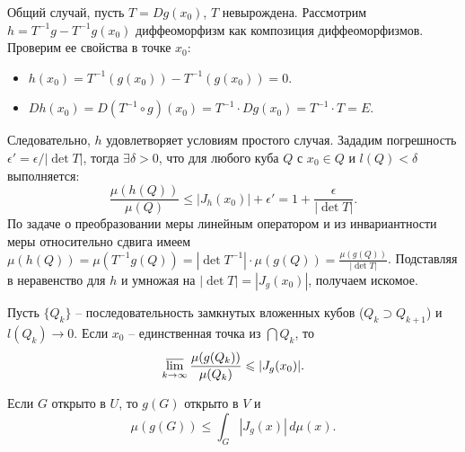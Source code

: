 \begin{myproof}
    \vspace{5pt}
    Общий случай, пусть $T = Dg(x_0)$, $T$ невырождена. Рассмотрим $h = T^{-1} g - T^{-1} g(x_0)$ диффеоморфизм как композиция диффеоморфизмов.
	Проверим ее свойства в точке $x_0$:
	\begin{itemize}[itemsep = 0pt, topsep = 5pt]
		\item $h(x_0) = T^{-1}(g(x_0)) - T^{-1}(g(x_0)) = 0$.
		\item $Dh(x_0) = D(T^{-1} \circ g)(x_0) = T^{-1} \cdot Dg(x_0) = T^{-1} \cdot T = E$.
	\end{itemize}
    Следовательно, $h$ удовлетворяет условиям простого случая. Зададим погрешность $\epsilon' = \epsilon / |\det T|$, тогда $\exists \delta > 0$, что для любого куба $Q$ с $x_0 \in Q$ и $l(Q) < \delta$ 
	выполняется: 
    \[ \frac{\mu(h(Q))}{\mu(Q)} \leq |J_h(x_0)| + \epsilon' = 1 + \frac{\epsilon}{|\det T|}. \]
    По задаче о преобразовании меры линейным оператором и из инвариантности меры относительно сдвига имеем $\mu(h(Q)) = \mu(T^{-1} g(Q)) = |\det T^{-1}| \cdot \mu(g(Q)) = \frac{\mu(g(Q))}{|\det T|}$. 
    Подставляя в неравенство для $h$ и умножая на $|\det T| = |J_g(x_0)|$, получаем искомое.
 \end{myproof}


 \begin{corollary}
    Пусть $\{Q_k\}$ -- последовательность замкнутых вложенных кубов ($Q_k \supset Q_{k+1}$) и $l(Q_k) \to 0$. 
    Если $x_0$ -- единственная точка из $\bigcap Q_k$, то 
    \[ \varlimsup \limits_{k \to \infty} \frac{\mu(g(Q_k))}{\mu(Q_k)} \leq |J_g(x_0)|. \]
 \end{corollary}

 \begin{lemma}
    Если $G$ открыто в $U$, то $g(G)$ открыто в $V$ и 
    \[ \mu(g(G)) \leq \int_{G} |J_g(x)| \, d\mu(x). \]
 \end{lemma}

